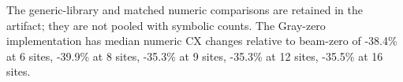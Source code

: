 The generic-library and matched numeric comparisons are retained in the artifact; they are not pooled with symbolic counts. The Gray-zero implementation has median numeric CX changes relative to beam-zero of -38.4\% at 6 sites, -39.9\% at 8 sites, -35.3\% at 9 sites, -35.3\% at 12 sites, -35.5\% at 16 sites.

